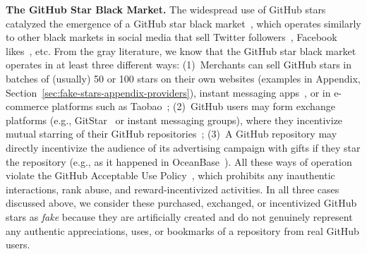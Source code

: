 \textbf{The GitHub Star Black Market.}
The widespread use of GitHub stars catalyzed the emergence of a GitHub star black market~\cite{wired-news},
which operates similarly to other black markets in social media that sell Twitter followers~\cite{DBLP:conf/imc/StringhiniWEKVZZ13}, Facebook likes~\cite{DBLP:conf/www/BeutelXGPF13}, etc. %
From the gray literature, we know that the GitHub star black market operates in at least three different ways:
(1)~Merchants can sell GitHub stars in batches of (usually) 50 or 100 stars on their own websites (examples in Appendix, Section~\ref{sec:fake-stars-appendix-providers}), instant messaging apps~\cite{DBLP:conf/acsac/DuYZDWH0020}, or in e-commerce platforms such as Taobao~\cite{taobao-github-star};
(2)~GitHub users may form exchange platforms (e.g., GitStar~\cite{gitstar} or instant messaging groups), where they incentivize mutual starring of their GitHub repositories~\cite{DBLP:conf/acsac/DuYZDWH0020};
(3)~A GitHub repository may directly incentivize the audience of its advertising campaign with gifts if they star the repository (e.g., as it happened in OceanBase~\cite{oceanbase}).
All these ways of operation violate the GitHub Acceptable Use Policy~\cite{github-policy}, which prohibits any inauthentic interactions, rank abuse, and reward-incentivized activities. 
In all three cases discussed above, we consider these purchased, exchanged, or incentivized GitHub stars as \emph{fake} because they are artificially created and do not genuinely represent any authentic appreciations, uses, or bookmarks of a repository from real GitHub users.

